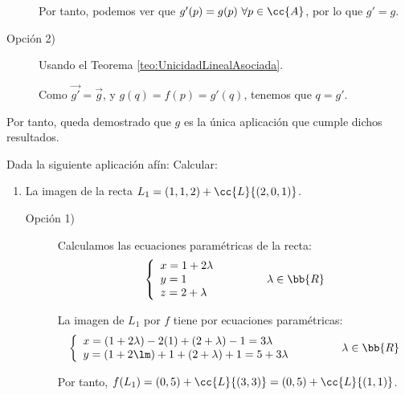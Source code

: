 \begin{ejercicio}
\begin{description}
        Por tanto, podemos ver que $g'(p)=g(p)~\forall p\in \cc{A}$, por lo que $g'=g$.

        \item[Opción 2)] Usando el Teorema \ref{teo:UnicidadLinealAsociada}.

        Como $\vec{g'}=\vec{g}$, y $g(q)=f(p)=g'(q)$, tenemos que $q=g'$.
    \end{description}
    
    
    Por tanto, queda demostrado que $g$ es la única aplicación que cumple dichos resultados.    
\end{ejercicio}

\begin{ejercicio}
    Dada la siguiente aplicación afín:
    Calcular:
    \begin{enumerate}
        \item La imagen de la recta $L_1 = (1, 1, 2) + \cc{L}\{(2, 0, 1)\}$.

        \begin{description}
            \item[Opción 1)]
            Calculamos las ecuaciones paramétricas de la recta:
            \begin{equation*}
                \left\{
                \begin{array}{l}
                    x = 1+2\lambda\\
                    y=1\\
                    z=2+\lambda
                \end{array}
                \right. \qquad\qquad \lambda\in \bb{R}
            \end{equation*}
    
            La imagen de $L_1$ por $f$ tiene por ecuaciones paramétricas:
            \begin{equation*}
                \left\{
                \begin{array}{l}
                    x = (1+2\lambda)-2(1)+(2+\lambda)-1 = 3\lambda\\
                    y= (1+2\lm) + 1 + (2+\lambda) +1=5+3\lambda
                \end{array}
                \right. \qquad\qquad \lambda\in \bb{R}
            \end{equation*}

            Por tanto, $f(L_1)=(0,5)+\cc{L}\{(3,3)\}=(0,5)+\cc{L}\{(1,1)\}$.


\end{description}
\end{enumerate}
\end{ejercicio}
